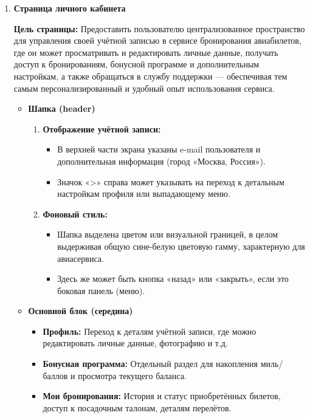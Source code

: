 \begin{enumerate}
    \item \textbf{Страница личного кабинета}

        \textbf{Цель страницы:} Предоставить пользователю централизованное пространство для управления своей учётной записью в сервисе бронирования авиабилетов, где он может просматривать и редактировать личные данные, получать доступ к бронированиям, бонусной программе и дополнительным настройкам, а также обращаться в службу поддержки — обеспечивая тем самым персонализированный и удобный опыт использования сервиса.
        \begin{itemize}
            \item \textbf{Шапка (header)}
            \begin{enumerate}
                \item \textbf{Отображение учётной записи:}
                \begin{itemize}
                    \item В верхней части экрана указаны e-mail пользователя и дополнительная информация (город «Москва, Россия»).
                    \item Значок «>» справа может указывать на переход к детальным настройкам профиля или выпадающему меню.
                \end{itemize}
                \item \textbf{Фоновый стиль:}
                \begin{itemize}
                    \item Шапка выделена цветом или визуальной границей, в целом выдерживая общую сине-белую цветовую гамму, характерную для авиасервиса.
                    \item Здесь же может быть кнопка «назад» или «закрыть», если это боковая панель (меню).
                \end{itemize}
            \end{enumerate}
            \item \textbf{Основной блок (середина)}
                \begin{itemize}
                    \item \textbf{Профиль:} Переход к деталям учётной записи, где можно редактировать личные данные, фотографию и т.д.
                    \item \textbf{Бонусная программа:} Отдельный раздел для накопления миль/баллов и просмотра текущего баланса.
                    \item \textbf{Мои бронирования:} История и статус приобретённых билетов, доступ к посадочным талонам, деталям перелётов.

\end{itemize}
\end{itemize}
\end{enumerate}
